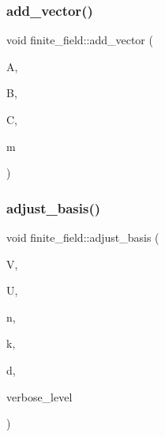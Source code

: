 \mbox{\label{classfinite__field_a23252c462d48cc21895de6fcc0cbb59f}} 
\subsubsection{\texorpdfstring{add\+\_\+vector()}{add\_vector()}}
{\footnotesize\ttfamily void finite\+\_\+field\+::add\+\_\+vector (\begin{DoxyParamCaption}\item[{\mbox{\hyperlink{galois_8h_a09fddde158a3a20bd2dcadb609de11dc}{I\+NT}} $\ast$}]{A,  }\item[{\mbox{\hyperlink{galois_8h_a09fddde158a3a20bd2dcadb609de11dc}{I\+NT}} $\ast$}]{B,  }\item[{\mbox{\hyperlink{galois_8h_a09fddde158a3a20bd2dcadb609de11dc}{I\+NT}} $\ast$}]{C,  }\item[{\mbox{\hyperlink{galois_8h_a09fddde158a3a20bd2dcadb609de11dc}{I\+NT}}}]{m }\end{DoxyParamCaption})}

\mbox{\label{classfinite__field_a0c88772c704cf766ce8b758ab6cc1886}} 
\subsubsection{\texorpdfstring{adjust\+\_\+basis()}{adjust\_basis()}}
{\footnotesize\ttfamily void finite\+\_\+field\+::adjust\+\_\+basis (\begin{DoxyParamCaption}\item[{\mbox{\hyperlink{galois_8h_a09fddde158a3a20bd2dcadb609de11dc}{I\+NT}} $\ast$}]{V,  }\item[{\mbox{\hyperlink{galois_8h_a09fddde158a3a20bd2dcadb609de11dc}{I\+NT}} $\ast$}]{U,  }\item[{\mbox{\hyperlink{galois_8h_a09fddde158a3a20bd2dcadb609de11dc}{I\+NT}}}]{n,  }\item[{\mbox{\hyperlink{galois_8h_a09fddde158a3a20bd2dcadb609de11dc}{I\+NT}}}]{k,  }\item[{\mbox{\hyperlink{galois_8h_a09fddde158a3a20bd2dcadb609de11dc}{I\+NT}}}]{d,  }\item[{\mbox{\hyperlink{galois_8h_a09fddde158a3a20bd2dcadb609de11dc}{I\+NT}}}]{verbose\+\_\+level }\end{DoxyParamCaption})}

